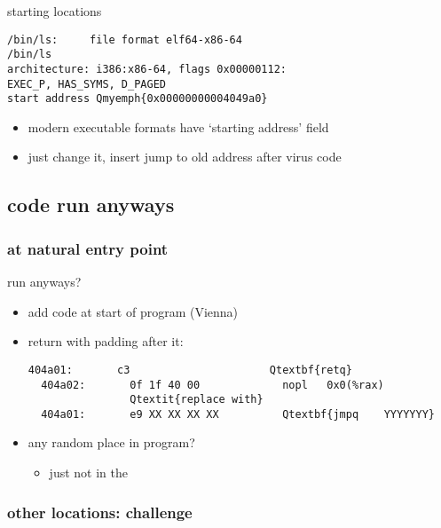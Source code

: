 \begin{frame}[fragile,label=invokeStarting]{starting locations}
\begin{Verbatim}[fontsize=\fontsize{10}{11}\selectfont,commandchars=Q\{\}]
/bin/ls:     file format elf64-x86-64
/bin/ls
architecture: i386:x86-64, flags 0x00000112:
EXEC_P, HAS_SYMS, D_PAGED
start address Qmyemph{0x00000000004049a0}
\end{Verbatim}
    \begin{itemize}
    \item modern executable formats have `starting address' field
    \item just change it, insert jump to old address after virus code
    \end{itemize}
\end{frame}


\subsection{code run anyways}

\subsubsection{at natural entry point}

\begin{frame}[fragile,label=runAnyways]{run anyways?}
    \begin{itemize}
    \item add code at start of program (Vienna)
    \item return with padding after it:
\begin{Verbatim}[fontsize=\fontsize{10}{11}\selectfont,commandchars=Q\{\}]
  404a01:       c3                      Qtextbf{retq}
  404a02:       0f 1f 40 00             nopl   0x0(%rax)
                Qtextit{replace with}
  404a01:       e9 XX XX XX XX          Qtextbf{jmpq    YYYYYYY}
\end{Verbatim}
    \item any random place in program?
        \begin{itemize}
        \item just not in the 
        \end{itemize}
    \end{itemize}
\end{frame}

\subsubsection{other locations: challenge}

